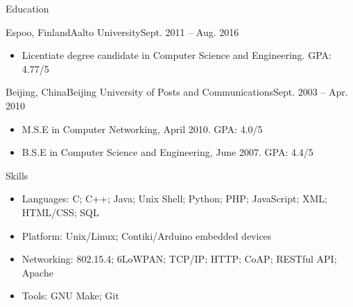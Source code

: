 \documentclass[print]{mcdowellcv}
\begin{document}
	\begin{cvsection}{Education}
		\begin{cvsubsection}{Espoo, Finland}{Aalto University}{Sept. 2011 -- Aug. 2016}
			\begin{itemize}
				\item Licentiate degree candidate in Computer Science and Engineering. GPA: 4.77/5
			\end{itemize}
		\end{cvsubsection}

		\begin{cvsubsection}[2]{Beijing, China}{Beijing University of Posts and Communications}{Sept. 2003 --  Apr. 2010}
			\begin{itemize}
				\item M.S.E in Computer Networking, April 2010. GPA: 4.0/5				 
				\item B.S.E in Computer Science and Engineering, June 2007. GPA: 4.4/5
			\end{itemize}
		\end{cvsubsection}
	\end{cvsection}
	
	\begin{cvsection}{Skills}
		\begin{cvsubsection}{}{}{}	
			\begin{itemize}
				\item Languages: C; C++; Java; Unix Shell; Python; PHP; JavaScript; XML; HTML/CSS; SQL
				\item Platform: Unix/Linux; Contiki/Arduino embedded devices
				\item Networking: 802.15.4; 6LoWPAN; TCP/IP; HTTP; CoAP; RESTful API; Apache
				\item Tools: GNU Make; Git
			\end{itemize}
		\end{cvsubsection}
	\end{cvsection}
\end{document}

